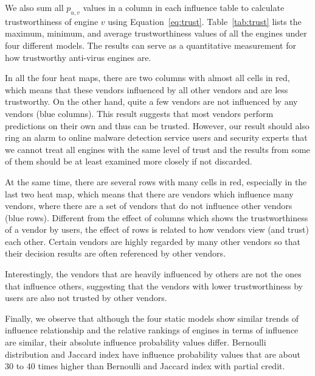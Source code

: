 We also sum all $p_{u,v}$ values in a column in each influence table 
to calculate trustworthiness of engine $v$ using Equation~\ref{eq:trust}. 
Table~\ref{tab:trust} lists the maximum, minimum, and average trustworthiness values of all the engines under four different models.
The results can serve as a quantitative measurement for how trustworthy anti-virus engines are. 

In all the four heat maps, there are two columns with almost all cells in red,
which means that these vendors influenced by all other vendors and are less trustworthy.
On the other hand, quite a few vendors are not influenced by any vendors (blue columns).
This result suggests that most vendors perform predictions on their own and thus can be trusted. 
However, our result should also ring an alarm to online malware detection service users and security experts that 
we cannot treat all engines with the same level of trust 
and the results from some of them should be at least examined more closely if not discarded.

At the same time, there are several rows with many cells in red, especially in the last two heat map, 
which means that there are vendors which influence many vendors,
where there are a set of vendors that do not influence other vendors (blue rows).
Different from the effect of columns which shows the trustworthiness of a vendor by users, 
the effect of rows is related to how vendors view (and trust) each other. 
Certain vendors are highly regarded by many other vendors so that 
their decision results are often referenced by other vendors.

Interestingly, the vendors that are heavily influenced by others are not the ones that influence others, 
suggesting that the vendors with lower trustworthiness by users are also not trusted by other vendors. 



Finally, we observe that although the four static models show similar trends of influence relationship 
and the relative rankings of engines in terms of influence are similar,
their absolute influence probability values differ. 
Bernoulli distribution and Jaccard index have influence probability values
that are about 30 to 40 times higher than
Bernoulli and Jaccard index with partial credit. 

